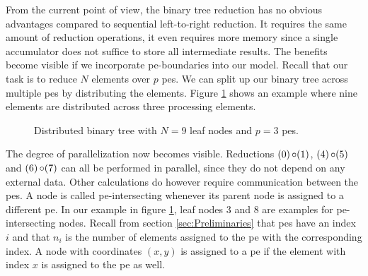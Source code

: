 From the current point of view, the binary tree reduction has no obvious advantages compared to sequential left-to-right reduction.
It requires the same amount of
reduction operations, it even requires more memory since a single accumulator does not suffice to store all intermediate results. The benefits become visible if we
incorporate \gls{pe}-boundaries into our model. Recall that our task is to reduce $N$ elements over $p$ \glspl{pe}. We can split up our binary tree across
multiple \glspl{pe} by distributing the elements. Figure \ref{fig:distributed_binary_tree} shows an example where nine elements are distributed
across three processing elements.
\begin{figure}[H]
\centering
{}
\caption{Distributed binary tree with $N=9$ leaf nodes and $p=3$ \glspl{pe}.}
\label{fig:distributed_binary_tree}
\end{figure}
The degree of parallelization now becomes visible. Reductions $(0) \operatorname{\circ} (1)$, $(4) \operatorname{\circ} (5)$ and $(6) \operatorname{\circ} (7)$ can all be performed in parallel, since
they do not depend on any external data. Other calculations do however require communication between the \glspl{pe}. A node is called \gls{pe}-intersecting
whenever its parent node is assigned to a different \gls{pe}. In our example in figure \ref{fig:distributed_binary_tree}, leaf nodes $3$ and $8$ are examples
for \gls{pe}-intersecting nodes.
Recall from section \ref{sec:Preliminaries} that \gls{pe}s have an index $i$ and that $n_i$ is the number of elements assigned to the \gls{pe} with the corresponding
index. A node with coordinates $(x, y)$ is assigned to a \gls{pe} if the element with index $x$ is assigned to the \gls{pe} as well.

